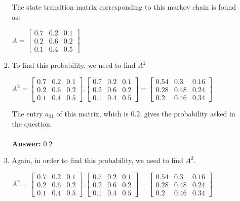 \documentclass[12pt,a4paper, margin=1in]{article}
\begin{document}
\begin{enumerate}
\begin{enumerate}
The state transition matrix corresponding to this markov chain is found as:
            \begin{center}
                $A = \begin{bmatrix}
                    0.7 & 0.2 & 0.1 \\
                    0.2 & 0.6 & 0.2 \\
                    0.1 & 0.4 & 0.5 
            \end{bmatrix}$
            \end{center}

            \item  To find this probability, we need to find $A^2$ 

\begin{center}
$A^2 =
\begin{bmatrix}
0.7 & 0.2 & 0.1 \\
0.2 & 0.6 & 0.2 \\
0.1 & 0.4 & 0.5 
\end{bmatrix}.
\begin{bmatrix}
0.7 & 0.2 & 0.1 \\
0.2 & 0.6 & 0.2 \\
0.1 & 0.4 & 0.5 
\end{bmatrix} = 
\begin{bmatrix}
0.54 & 0.3 & 0.16 \\
0.28 & 0.48 & 0.24 \\
0.2 & 0.46 & 0.34 
\end{bmatrix}
$ 
\end{center}

The entry $a_{31}$ of this matrix, which is 0.2, gives the probability asked in the question. \\\\
\textbf{Answer: } 0.2

\newpage
            \item Again, in order to find this probability, we need to find $A^2$.
\begin{center}
$A^2 =
\begin{bmatrix}
0.7 & 0.2 & 0.1 \\
0.2 & 0.6 & 0.2 \\
0.1 & 0.4 & 0.5 
\end{bmatrix}.
\begin{bmatrix}
0.7 & 0.2 & 0.1 \\
0.2 & 0.6 & 0.2 \\
0.1 & 0.4 & 0.5 
\end{bmatrix} = 
\begin{bmatrix}
0.54 & 0.3 & 0.16 \\
0.28 & 0.48 & 0.24 \\
0.2 & 0.46 & 0.34 
\end{bmatrix}
$ 
\end{center}


\end{enumerate}
\end{enumerate}
\end{document}
